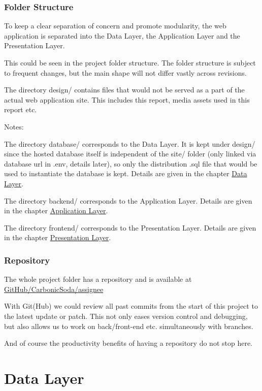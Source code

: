 \documentclass[12pt]{report}
\newcommand{\n}{\par}
\newcommand{\br}{\vspace{1 em}\n}
\begin{document}
\subsection{Folder Structure} \label{overview.project-structure.folder-structure}
To keep a clear separation of concern and promote modularity,
the web application is separated into
the Data Layer, the Application Layer and the Presentation Layer.
\br
This could be seen in the project folder structure.
The folder structure is subject to frequent changes,
but the main shape will not differ vastly across revisions.
\br
{}
\vspace{2 em}
The directory design/ contains files that would not be served as a part of the actual web application site.
This includes this report, media assets used in this report etc.
\br
Notes:\n
The directory database/ corresponds to the Data Layer. It is kept under design/ since the hosted database
itself is independent of the site/ folder (only linked via database url in .env, details later),
so only the distribution .sql file that would be used to instantiate the database is kept.
Details are given in the chapter \hyperref[data-layer]{Data Layer}.
\br
The directory backend/ corresponds to the Application Layer.
Details are given in the chapter \hyperref[application-layer]{Application Layer}.
\br
The directory frontend/ corresponds to the Presentation Layer.
Details are given in the chapter \hyperref[presentation-layer]{Presentation Layer}.
\subsection{Repository} \label{overview.project-structure.repository}
The whole project folder has a repository and is available at
\href{https://github.com/CarbonicSoda/assignee}{GitHub/Carbonic\-Soda/assignee}
\br
With Git(Hub) we could review all past commits from the start of this project to the latest update or patch.
This not only eases version control and debugging,
but also allows us to work on back/front-end etc. simultaneously with branches.
\br
And of course the productivity benefits of having a repository do not stop here.

\chapter{Data Layer} \label{data-layer}
\end{document}
